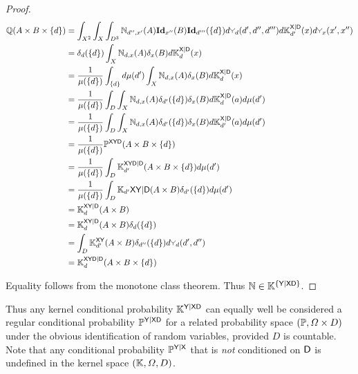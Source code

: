 \begin{proof}
\begin{align}
\prob{Q}(A\times B\times \{d\}) &= \int_{X^2} \int_X \int_{D^3} \kernel{N}_{d'',x'}(A) \textbf{Id}_{x''}(B) \textbf{Id}_{d'''} (\{d\}) d\splitter{0.1}_d(d',d'',d''') d\kernel{K}^{\RV{X}|\RV{D}}_{d'}(x)d\splitter{0.1}_x(x',x'')\\
							&= \delta_d(\{d\}) \int_X \kernel{N}_{d,x}(A) \delta_x(B) d\kernel{K}^{\RV{X}|\RV{D}}_d(x)\\
							&= \frac{1}{\mu(\{d\})} \int_{\{d\}} d\mu(d') \int_X \kernel{N}_{d,x}(A) \delta_x(B) d\kernel{K}^{\RV{X}|\RV{D}}_d(x)\\
							&= \frac{1}{\mu(\{d\})} \int_D\int_X \kernel{N}_{d,x}(A) \delta_{d'}(\{d\}) \delta_x(B) d\kernel{K}^{\RV{X}|\RV{D}}_d(a) d\mu(d')\\
							&= \frac{1}{\mu(\{d\})} \int_D\int_X \kernel{N}_{d,x}(A) \delta_{d'}(\{d\}) \delta_x(B) d\kernel{K}^{\RV{X}|\RV{D}}_{d'}(a) d\mu(d')\\
							&= \frac{1}{\mu(\{d\})} \prob{P}^{\RV{X}\RV{Y}\RV{D}}(A\times B\times \{d\})\\
							&= \frac{1}{\mu(\{d\})} \int_D \kernel{K}_{d'}^{\RV{X}\RV{Y}\RV{D}|\RV{D}}(A\times B\times \{d\})d\mu(d')\\
							&= \frac{1}{\mu(\{d\})} \int_D \kernel{K}_{d'}{\RV{X}\RV{Y}|\RV{D}}(A\times B) \delta_{d'}(\{d\})d\mu(d')\\
							&= \kernel{K}_{d}^{\RV{X}\RV{Y}|\RV{D}}(A\times B)\\
							&= \kernel{K}_d^{\RV{X}\RV{Y}|\RV{D}}(A\times B) \delta_d(\{d\})\\
							&= \int_D \kernel{K}_{d'}^{\RV{X}\RV{Y}} (A\times B) \delta_{d''}(\{d\}) d\splitter{0.1}_d(d',d'')\\
							&= \kernel{K}_d^{\RV{X}\RV{Y}\RV{D}|\RV{D}}(A\times B\times \{d\})
\end{align}


Equality follows from the monotone class theorem. Thus $\mathbb{N}\in \mathbb{K}^{\{\mathsf{Y}|\mathsf{X}\mathsf{D}\}}$.
\end{proof}

Thus any kernel conditional probability $\mathbb{K}^{\mathsf{Y}|\mathsf{X}\mathsf{D}}$ can equally well be considered a regular conditional probability $\mathbb{P}^{\mathsf{Y}|\mathsf{X}\mathsf{D}}$ for a related probability space $(\mathbb{P},\Omega\times D)$ under the obvious identification of random variables, provided $D$ is countable. Note that any conditional probability $\mathbb{P}^{\mathsf{Y}|\mathsf{X}}$ that is \emph{not} conditioned on $\mathsf{D}$ is undefined in the kernel space $(\mathbb{K},\Omega,D)$.

